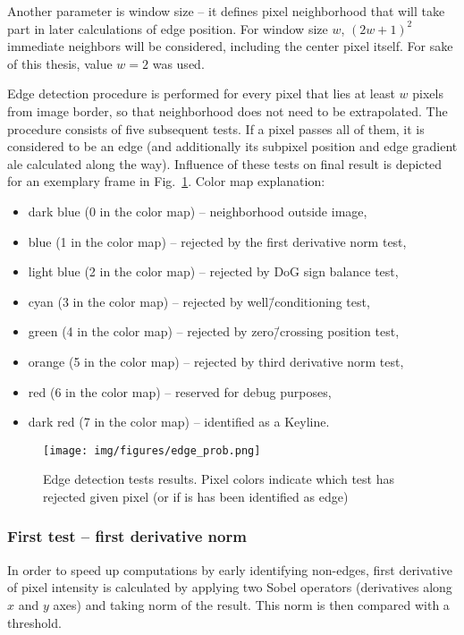 Another parameter is window size -- it defines pixel neighborhood that will take part in later calculations of edge position. For window size $w$, $(2w+1)^2$ immediate neighbors will be considered, including the center pixel itself. For sake of this thesis, value $w = 2$ was used. 

Edge detection procedure is performed for every pixel that lies at least $w$ pixels from image border, so that neighborhood does not need to be extrapolated. The procedure consists of five subsequent tests. If a pixel passes all of them, it is considered to be an edge (and additionally its subpixel position and edge gradient ale calculated along the way). Influence of these tests on final result is depicted for an exemplary frame in Fig.~\ref{fig:edgeprob}. Color map explanation:
\begin{itemize}[topsep=0.5em]
	\itemsep-0.25em
	\item dark blue (0 in the color map) -- neighborhood outside image,
	\item blue (1 in the color map) -- rejected by the first derivative norm test,
	\item light blue (2 in the color map) -- rejected by DoG sign balance test,
	\item cyan (3 in the color map) -- rejected by well\=/conditioning test,
	\item green (4 in the color map) -- rejected by zero\=/crossing position test,
	\item orange (5 in the color map) -- rejected by third derivative norm test,
	\item red (6 in the color map) -- reserved for debug purposes,
	\item dark red (7 in the color map) -- identified as a Keyline.
\end{itemize}

\begin{figure}[ht]
	\centering\texttt{[image: img/figures/edge\_prob.png]}
	\caption{ Edge detection tests results. Pixel colors indicate which test has rejected given pixel (or if is has been identified as edge)}
	\label{fig:edgeprob}
\end{figure}

\subsubsection*{First test -- first derivative norm}
\label{edge_first}

 In order to speed up computations by early identifying non-edges, first derivative of pixel intensity is calculated by applying two Sobel operators (derivatives along $x$ and $y$ axes) and taking norm of the result. This norm is then compared with a threshold. 


